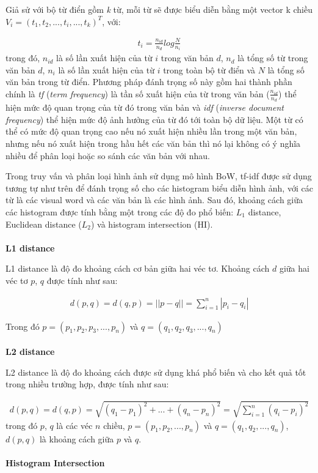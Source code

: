 Giả sử với bộ từ điển gồm \textit{k} từ, mỗi từ sẽ được biểu diễn bằng một vector k chiều $V_i = (t_1, t_2, ..., t_i, ..., t_k)^T$, với:

\begin{eqnarray}
t_i = \frac{n_{id}}{n_d}log\frac{N}{n_i}
\end{eqnarray}
trong đó, $n_{id}$ là số lần xuất hiện của từ $i$ trong văn bản $d$, $n_d$ là tổng số từ trong văn bản $d$, $n_i$ là số lần xuất hiện của từ $i$ trong toàn bộ từ điển và $N$ là tổng số văn bản trong từ điển. Phương pháp đánh trọng số này gồm hai thành phần chính là \textit{tf} (\textit{term frequency}) là tần số xuất hiện của từ trong văn bản ($\frac{n_{id}}{n_d}$) thể hiện mức độ quan trọng của từ đó trong văn bản và \textit{idf} (\textit{inverse document frequency}) thể hiện mức độ ảnh hưởng của từ đó tới toàn bộ dữ liệu. Một từ có thể có mức độ quan trọng cao nếu nó xuất hiện nhiều lần trong một văn bản, nhưng nếu nó xuất hiện trong hầu hết các văn bản thì nó lại không có ý nghĩa nhiều để phân loại hoặc so sánh các văn bản với nhau.

Trong truy vấn và phân loại hình ảnh sử dụng mô hình BoW, tf-idf được sử dụng tương tự như trên để đánh trọng số cho các histogram biểu diễn hình ảnh, với các từ là các visual word và các văn bản là các hình ảnh. Sau đó, khoảng cách giữa các histogram được tính bằng một trong các độ đo phổ biến: $L_1$ distance\cite{krauss1987taxicab}, Euclidean distance ($L_2$)\cite{deza2009encyclopedia} và histogram intersection (HI)\cite{cheng2010mammographic}.
\\
\\
\textbf{L1 distance}

L1 distance là độ đo khoảng cách cơ bản giữa hai véc tơ. Khoảng cách $d$ giữa hai véc tơ $p$, $q$ được tính như sau:

\begin{eqnarray}
d(p,q) = d(q,p) = ||p-q|| = \sum\limits_{i=1}^n |p_i - q_i|
\end{eqnarray}

Trong đó $p = (p_1, p_2, p_3, ..., p_n)$ và $q = (q_1, q_2, q_3, ..., q_n)$
\\
\\
\textbf{L2 distance}

L2 distance là độ đo khoảng cách được sử dụng khá phổ biến và cho kết quả tốt trong nhiều trường hợp, được tính như sau:

\begin{eqnarray}
d(p,q) = d(q,p) = \sqrt{(q_1-p_1)^2 + ... + (q_n-p_n)^2} = \sqrt{\sum\limits_{i=1}^n (q_i - p_i)^2}
\end{eqnarray}
trong đó $p$, $q$ là các véc $n$ chiều, $p = (p_1, p_2, ..., p_n)$ và $q = (q_1, q_2, ..., q_n)$, $d(p,q)$ là khoảng cách giữa $p$ và $q$.
\\
\\
\textbf{Histogram Intersection}

